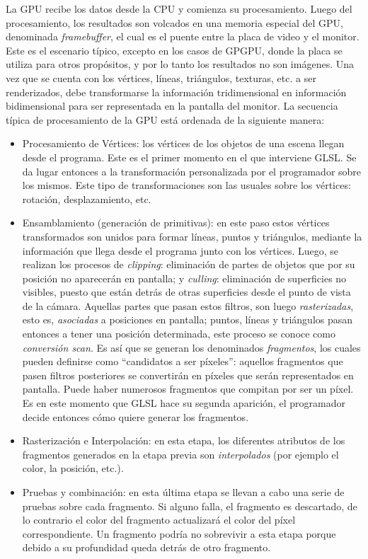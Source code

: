 La GPU recibe los datos desde la CPU y comienza su procesamiento.
Luego del procesamiento, los resultados son volcados en una memoria especial del GPU, denominada {\em framebuffer}, el cual es el puente entre la placa de video y el monitor.
Este es el escenario típico, excepto en los casos de GPGPU, donde la placa se utiliza para otros propósitos, y por lo tanto los resultados no son imágenes.
Una vez que se cuenta con los vértices, líneas, triángulos, texturas, etc. a ser renderizados, debe transformarse la información tridimensional en información bidimensional para ser representada en la pantalla del monitor.
La secuencia t\'ipica de procesamiento de la GPU est\'a ordenada de la siguiente manera:
\begin{itemize}
\item Procesamiento de V\'ertices: los v\'ertices de los objetos de una escena llegan desde el programa. Este es el primer momento en el que interviene GLSL. Se da lugar entonces a la transformaci\'on personalizada por el programador sobre los mismos. Este tipo de transformaciones son las usuales sobre los v\'ertices: rotaci\'on, desplazamiento, etc.
\item Ensamblamiento (generación de primitivas): en este paso estos v\'ertices transformados son unidos para formar l\'ineas, puntos y tri\'angulos, mediante la informaci\'on que llega desde el programa junto con los v\'ertices. Luego, se realizan los procesos de {\em clipping}: eliminaci\'on de partes de objetos que por su posici\'on no aparecer\'an en pantalla; y {\em culling}: eliminaci\'on de superficies no visibles, puesto que est\'an detr\'as de otras superficies desde el punto de vista de la c\'amara. Aquellas partes que pasan estos filtros, son luego {\em rasterizadas}, esto es, {\em asociadas} a posiciones en pantalla; puntos, l\'ineas y tri\'angulos pasan entonces a tener una posici\'on determinada, este proceso se conoce como {\em conversi\'on scan}. Es as\'i que se generan los denominados {\em fragmentos}, los cuales pueden definirse como ``candidatos a ser p\'ixeles'': aquellos fragmentos que pasen filtros posteriores se convertir\'an en p\'ixeles que ser\'an representados en pantalla. Puede haber numerosos fragmentos que compitan por ser un p\'ixel. Es en este momento que GLSL hace su segunda aparici\'on, el programador decide entonces c\'omo quiere generar los fragmentos.
\item Rasterización e Interpolaci\'on: en esta etapa, los diferentes atributos de los fragmentos generados en la etapa previa son {\em interpolados} (por ejemplo el color, la posición, etc.).
\item Pruebas y combinación: en esta \'ultima etapa se llevan a cabo una serie de pruebas sobre cada fragmento. Si alguno falla, el fragmento es descartado, de lo contrario el color del fragmento actualizar\'a el color del p\'ixel correspondiente. Un fragmento podr\'ia no sobrevivir a esta etapa porque debido a su profundidad queda detr\'as de otro fragmento.
\end{itemize}

